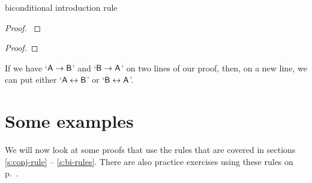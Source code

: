 \begin{factboxy}{biconditional introduction rule}
\begin{proof}\label{eiff-I}
	 
\end{proof}
\begin{proof}
	 
\end{proof}

\small{If we have `$\mathsf{A}\rightarrow\mathsf{B}$' and `$\mathsf{B}\rightarrow\mathsf{A}$' on two lines of our proof, then, on a new line, we can put either `$\mathsf{A}\leftrightarrow\mathsf{B}$' or `$\mathsf{B}\leftrightarrow\mathsf{A}$'.}

\end{factboxy}





\section{Some examples}

We will now look at some proofs that use the rules that are covered in sections \ref{s:conj-rule} -- \ref{s:bi-rules}. There are also practice exercises using these rules on p.~\pageref{practice-proofs-1}. 

